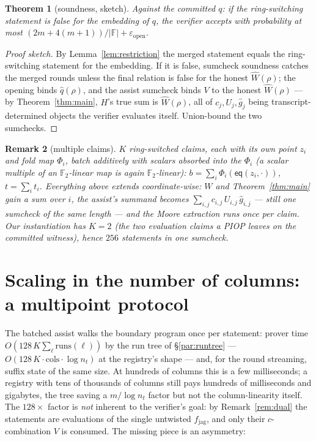 \documentclass[11pt]{article}
\newcommand{\F}{\mathbb{F}}
\newcommand{\Ftwo}{\F_2}
\newcommand{\eq}{\mathsf{eq}}
\newcommand{\fjag}{\hat f_{\mathrm{jag}}}
\newtheorem{theorem}{Theorem}
\newtheorem{remark}[theorem]{Remark}
\begin{document}
\begin{theorem}[soundness, sketch]\label{thm:soundness}
Against the committed $q$: if the ring-switching statement is false
for the embedding of $q$, the verifier accepts with
probability at most
$(2m + 4(m{+}1))/|\F| + \varepsilon_{\mathrm{open}}$.
\end{theorem}

\begin{proof}[Proof sketch]
By Lemma~\ref{lem:restriction} the merged statement equals the
ring-switching statement for the embedding. If it is false, sumcheck
soundness catches the merged rounds unless the final relation is false
for the honest $\widehat W(\rho)$; the opening binds $\hat q(\rho)$,
and the assist sumcheck binds $V$ to the honest $\widehat W(\rho)$ ---
by Theorem~\ref{thm:main}, $H$'s true sum is $\widehat W(\rho)$, all
of $c_{j}, U_{j}, \hat g_{j}$ being transcript-determined objects the
verifier evaluates itself. Union-bound the two sumchecks.
\end{proof}

\begin{remark}[multiple claims]\label{rem:multi}
$K$ ring-switched claims, each with its own point $z_i$ and fold map
$\Phi_i$, batch additively with scalars absorbed into the $\Phi_i$ (a
scalar multiple of an $\Ftwo$-linear map is again $\Ftwo$-linear):
$b = \sum_i \Phi_i(\eq(z_i, \cdot))$, $t = \sum_i t_i$. Everything
above extends coordinate-wise: $W$ and Theorem~\ref{thm:main} gain a
sum over $i$, the assist's summand becomes
$\sum_{i,j} c_{i,j}\, U_{i,j}\, \hat g_{i,j}$ --- still one sumcheck
of the same length --- and the Moore extraction runs once per claim.
Our instantiation has $K = 2$ (the two evaluation claims a PIOP leaves
on the committed witness), hence $256$ statements in one sumcheck.
\end{remark}

\section{Scaling in the number of columns: a multipoint
protocol}\label{sec:multipoint}

The batched assist walks the boundary program once per statement:
prover time $O(128\,K \sum_\ell \mathrm{runs}(\ell))$ by the run tree
of \S\ref{par:runtree} --- $O(128\,K \cdot \mathrm{cols}\cdot\log n_t)$
at the registry's shape --- and, for the round streaming, suffix state
of the same size. At hundreds of columns this is a few milliseconds; a
registry with tens of thousands of columns still pays hundreds of
milliseconds and gigabytes, the tree saving a $m/\log n_t$ factor but
not the column-linearity itself. The
$128\times$ factor is \emph{not} inherent to the verifier's goal: by
Remark~\ref{rem:dual} the statements are evaluations of the single
untwisted $\fjag$, and only their $c$-combination $V$ is consumed. The
missing piece is an asymmetry:
\end{document}
